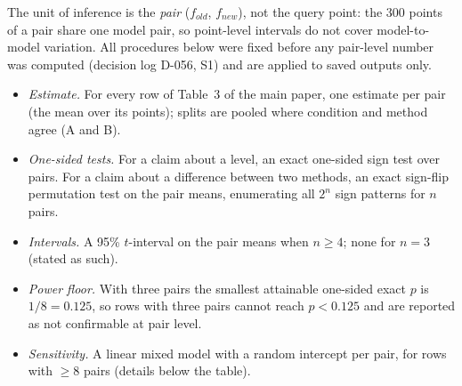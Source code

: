 \documentclass[10pt,a4paper]{article}
\theoremstyle{remark}
\begin{document}
The unit of inference is the \emph{pair} ($f_{old}$, $f_{new}$), not the query point: the 300 points of a pair share one model pair, so point-level intervals do not cover model-to-model variation. All procedures below were fixed before any pair-level number was computed (decision log D-056, S1) and are applied to saved outputs only.
\begin{itemize}
\item \emph{Estimate.} For every row of Table~3 of the main paper, one estimate per pair (the mean over its points); splits are pooled where condition and method agree (A and B).
\item \emph{One-sided tests.} For a claim about a level, an exact one-sided sign test over pairs. For a claim about a difference between two methods, an exact sign-flip permutation test on the pair means, enumerating all $2^n$ sign patterns for $n$ pairs.
\item \emph{Intervals.} A 95\% $t$-interval on the pair means when $n\ge4$; none for $n=3$ (stated as such).
\item \emph{Power floor.} With three pairs the smallest attainable one-sided exact $p$ is $1/8=0.125$, so rows with three pairs cannot reach $p<0.125$ and are reported as not confirmable at pair level.
\item \emph{Sensitivity.} A linear mixed model with a random intercept per pair, for rows with $\ge8$ pairs (details below the table).
\end{itemize}
\end{document}
